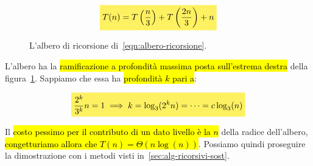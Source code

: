 \documentclass[a4paper,11pt,twoside]{article}
\theoremstyle{plain}
\theoremstyle{definition}
\theoremstyle{remark}
\newcommand{\mhl}[1]{\colorbox{hlcolor}{$\displaystyle #1$}}
\begin{document}
\begin{equation}
  \mhl{
    T(n) = T\left(\frac{n}{3}\right) + T\left(\frac{2n}{3}\right) + n\label{eqn:albero-ricorsione}
  }
\end{equation}

\begin{figure}[htb]
  \centering
  \caption{L'albero di ricorsione di~\ref{eqn:albero-ricorsione}.}%
  \label{fig:albero-ricorsione}
\end{figure}

L'albero ha la \hl{ramificazione a profondità massima posta sull'estrema destra}
della figura~\ref{fig:albero-ricorsione}. Sappiamo che essa ha \hl{profondità $k$
pari a}:

\begin{equation}
  \mhl{
    \frac{2^k}{3^k} n = 1 \implies{} k = \log_3(2^k n) = \cdots = c\log_3(n)
  }
\end{equation}

Il \hl{costo pessimo per il contributo di un dato livello è la $n$} della radice
dell'albero, \hl{congetturiamo allora che $T(n) = \Theta(n\log(n))$}. Possiamo
quindi proseguire la dimostrazione con i metodi visti
in~\ref{sec:alg-ricorsivi-sost}.
\end{document}
